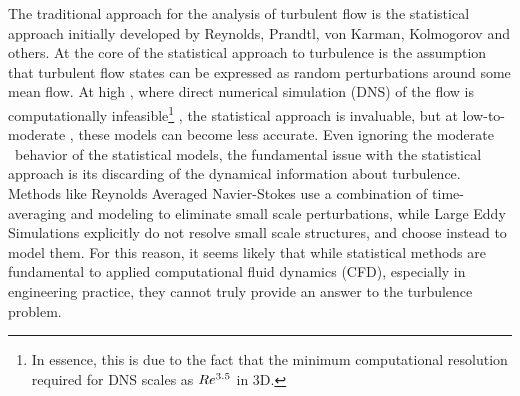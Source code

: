 The traditional approach for the analysis of turbulent flow is the statistical approach initially developed by Reynolds, Prandtl, von Karman, Kolmogorov and others. At the core of the statistical approach to turbulence is the assumption that turbulent flow states can be expressed as random perturbations around some mean flow. At high \ReN, where direct numerical simulation (DNS) of the flow is computationally infeasible\footnote{In essence, this is due to the fact that the minimum computational resolution required for DNS scales as $Re^{3.5}$ in 3D.} , the statistical approach is invaluable, but at low-to-moderate \ReN, these models can become less accurate. Even ignoring the moderate \ReN\ behavior of the statistical models, the fundamental issue with the statistical approach is its discarding of the dynamical information about turbulence. Methods like Reynolds Averaged Navier-Stokes use a combination of time-averaging and modeling to eliminate small scale perturbations, while Large Eddy Simulations explicitly do not resolve small scale structures, and choose instead to model them. For this reason, it seems likely that while statistical methods are fundamental to applied computational fluid dynamics (CFD), especially in engineering practice, they cannot truly provide an answer to the turbulence problem. \\

